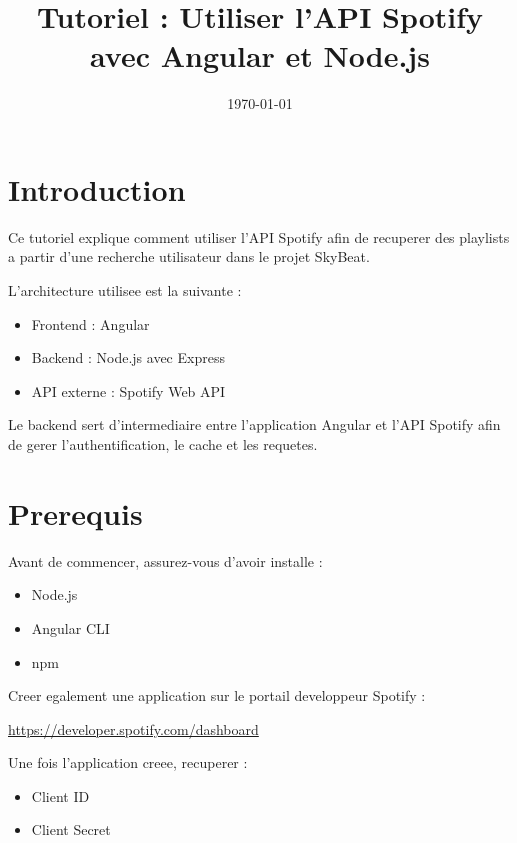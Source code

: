 \documentclass[a4paper,11pt]{article}
\title{Tutoriel : Utiliser l'API Spotify avec Angular et Node.js}
\author{}
\date{\today}
\begin{document}
\maketitle

\tableofcontents
\newpage

\section{Introduction}

Ce tutoriel explique comment utiliser l'API Spotify afin de recuperer des playlists a partir d'une recherche utilisateur dans le projet SkyBeat.

L'architecture utilisee est la suivante :

\begin{itemize}
\item Frontend : Angular
\item Backend : Node.js avec Express
\item API externe : Spotify Web API
\end{itemize}

Le backend sert d'intermediaire entre l'application Angular et l'API Spotify afin de gerer l'authentification, le cache et les requetes.

\section{Prerequis}

Avant de commencer, assurez-vous d'avoir installe :

\begin{itemize}
\item Node.js
\item Angular CLI
\item npm
\end{itemize}

Creer egalement une application sur le portail developpeur Spotify :

\begin{center}
\url{https://developer.spotify.com/dashboard}
\end{center}

Une fois l'application creee, recuperer :

\begin{itemize}
\item Client ID
\item Client Secret
\end{itemize}
\end{document}
